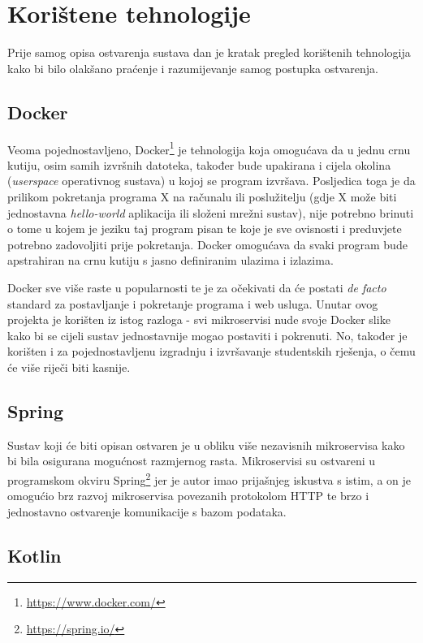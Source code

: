\documentclass[times, utf8, zavrsni]{fer}
\begin{document}
\section{Korištene tehnologije}

Prije samog opisa ostvarenja sustava dan je kratak pregled korištenih tehnologija kako bi bilo olakšano praćenje i razumijevanje samog postupka ostvarenja.

\subsection{Docker}

Veoma pojednostavljeno, Docker{\footnote{\url{https://www.docker.com/}}} je tehnologija koja omogućava da u jednu crnu kutiju, osim samih izvršnih datoteka, također bude upakirana i cijela okolina (\textit{userspace} operativnog sustava) u kojoj se program izvršava. Posljedica toga je da prilikom pokretanja programa X na računalu ili poslužitelju (gdje X može biti jednostavna \textit{hello-world} aplikacija ili složeni mrežni sustav), nije potrebno brinuti o tome u kojem je jeziku taj program pisan te koje je sve ovisnosti i preduvjete potrebno zadovoljiti prije pokretanja. Docker omogućava da svaki program bude apstrahiran na crnu kutiju s jasno definiranim ulazima i izlazima.

Docker sve više raste u popularnosti te je za očekivati da će postati \textit{de facto} standard za postavljanje i pokretanje programa i web usluga. Unutar ovog projekta je korišten iz istog razloga - svi mikroservisi nude svoje Docker slike kako bi se cijeli sustav jednostavnije mogao postaviti i pokrenuti. No, također je korišten i za pojednostavljenu izgradnju i izvršavanje studentskih rješenja, o čemu će više riječi biti kasnije.

\subsection{Spring}

Sustav koji će biti opisan ostvaren je u obliku više nezavisnih mikroservisa kako bi bila osigurana mogućnost razmjernog rasta. Mikroservisi su ostvareni u programskom okviru Spring{\footnote{\url{https://spring.io/}}} jer je autor imao prijašnjeg iskustva s istim, a on je omogućio brz razvoj mikroservisa povezanih protokolom HTTP te brzo i jednostavno ostvarenje komunikacije s bazom podataka.

\subsection{Kotlin}
\end{document}
